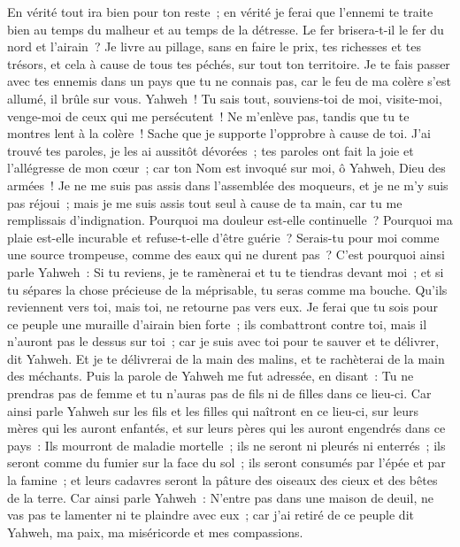 \begin{multicols}{2}
En vérité tout ira bien pour ton reste~; en vérité je ferai que l'ennemi te traite bien au temps du malheur et au temps de la détresse.
Le fer brisera-t-il le fer du nord et l'airain~?
Je livre au pillage, sans en faire le prix, tes richesses et tes trésors, et cela à cause de tous tes péchés, sur tout ton territoire.
Je te fais passer avec tes ennemis dans un pays que tu ne connais pas, car le feu de ma colère s'est allumé, il brûle sur vous.
Yahweh~! Tu sais tout, souviens-toi de moi, visite-moi, venge-moi de ceux qui me persécutent~! Ne m'enlève pas, tandis que tu te montres lent à la colère~! Sache que je supporte l'opprobre à cause de toi.
J'ai trouvé tes paroles, je les ai aussitôt dévorées~; tes paroles ont fait la joie et l'allégresse de mon cœur~; car ton Nom est invoqué sur moi, ô Yahweh, Dieu des armées~!
Je ne me suis pas assis dans l'assemblée des moqueurs, et je ne m'y suis pas réjoui~; mais je me suis assis tout seul à cause de ta main, car tu me remplissais d'indignation.
Pourquoi ma douleur est-elle continuelle~? Pourquoi ma plaie est-elle incurable et refuse-t-elle d'être guérie~? Serais-tu pour moi comme une source trompeuse, comme des eaux qui ne durent pas~?
C'est pourquoi ainsi parle Yahweh~: Si tu reviens, je te ramènerai et tu te tiendras devant moi~; et si tu sépares la chose précieuse de la méprisable, tu seras comme ma bouche. Qu'ils reviennent vers toi, mais toi, ne retourne pas vers eux.
Je ferai que tu sois pour ce peuple une muraille d'airain bien forte~; ils combattront contre toi, mais il n'auront pas le dessus sur toi~; car je suis avec toi pour te sauver et te délivrer, dit Yahweh.
Et je te délivrerai de la main des malins, et te rachèterai de la main des méchants.
\VerseOne{}Puis la parole de Yahweh me fut adressée, en disant~:
Tu ne prendras pas de femme et tu n'auras pas de fils ni de filles dans ce lieu-ci.
Car ainsi parle Yahweh sur les fils et les filles qui naîtront en ce lieu-ci, sur leurs mères qui les auront enfantés, et sur leurs pères qui les auront engendrés dans ce pays~:
Ils mourront de maladie mortelle~; ils ne seront ni pleurés ni enterrés~; ils seront comme du fumier sur la face du sol~; ils seront consumés par l'épée et par la famine~; et leurs cadavres seront la pâture des oiseaux des cieux et des bêtes de la terre.
Car ainsi parle Yahweh~: N'entre pas dans une maison de deuil, ne vas pas te lamenter ni te plaindre avec eux~; car j'ai retiré de ce peuple dit Yahweh, ma paix, ma miséricorde et mes compassions.

\end{multicols}
